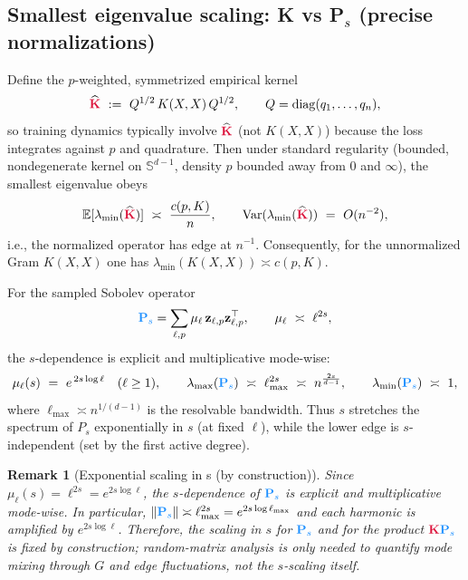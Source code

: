 \documentclass{article}
\newcommand{\Kmat}{\textcolor{kernelcolor}{\mathbf{K}}}
\newcommand{\Psmat}{\textcolor{sobolevcolor}{\mathbf{P}_s}}
\newcommand{\E}{\mathbb{E}}
\newcommand{\Sphere}{\mathbb{S}^{d-1}}
\newtheorem{remark}{Remark}
\begin{document}
\subsection{Smallest eigenvalue scaling: K vs P$_s$ (precise normalizations)}
Define the $p$-weighted, symmetrized empirical kernel
\[
\widehat{\Kmat}\ :=\ Q^{1/2}\,K(X,X)\,Q^{1/2},\qquad Q=\mathrm{diag}(q_1,\dots,q_n),
\]
so training dynamics typically involve $\widehat{\Kmat}$ (not $K(X,X)$) because the loss integrates against $p$ and quadrature. Then under standard regularity (bounded, nondegenerate kernel on $\Sphere$, density $p$ bounded away from $0$ and $\infty$), the smallest eigenvalue obeys
\begin{equation}
\E[\lambda_{\min}(\widehat{\Kmat})]\ \asymp\ \frac{c(p,K)}{n},\qquad \operatorname{Var}(\lambda_{\min}(\widehat{\Kmat}))\ =\ O(n^{-2}), \label{eq:lmin-K-hat}
\end{equation}
i.e., the normalized operator has edge at $n^{-1}$. Consequently, for the unnormalized Gram $K(X,X)$ one has $\lambda_{\min}(K(X,X))\asymp c(p,K)$.

For the sampled Sobolev operator
\[
\Psmat=\sum_{\ell,p}\mu_\ell\,\mathbf{z}_{\ell,p}\mathbf{z}_{\ell,p}^\top,\qquad \mu_\ell\ \asymp\ \ell^{2s},
\]
the $s$-dependence is explicit and multiplicative mode-wise:
\begin{equation}
\mu_\ell(s)\ =\ e^{\,2s\log\ell}\quad(\ell\ge 1),\qquad
\lambda_{\max}(\Psmat)\ \asymp\ \ell_{\max}^{2s}\ \asymp\ n^{\frac{2s}{d-1}}, \qquad
\lambda_{\min}(\Psmat)\ \asymp\ 1, \label{eq:Ps-spectrum-s}
\end{equation}
where $\ell_{\max}\asymp n^{1/(d-1)}$ is the resolvable bandwidth. Thus $s$ stretches the spectrum of $P_s$ exponentially in $s$ (at fixed $\ell$), while the lower edge is $s$-independent (set by the first active degree).

\begin{remark}[Exponential scaling in s (by construction)]
Since $\mu_\ell(s)=\ell^{2s}=e^{2s\log\ell}$, the $s$-dependence of $\Psmat$ is explicit and multiplicative mode-wise. In particular,
$\|\Psmat\|\asymp \ell_{\max}^{2s}=e^{2s\log\ell_{\max}}$ and each harmonic is amplified by $e^{2s\log\ell}$. Therefore, the scaling in $s$ for $\Psmat$ and for the product $\Kmat\Psmat$ is fixed by construction; random-matrix analysis is only needed to quantify mode mixing through $G$ and edge fluctuations, not the $s$-scaling itself.
\end{remark}
\end{document}
